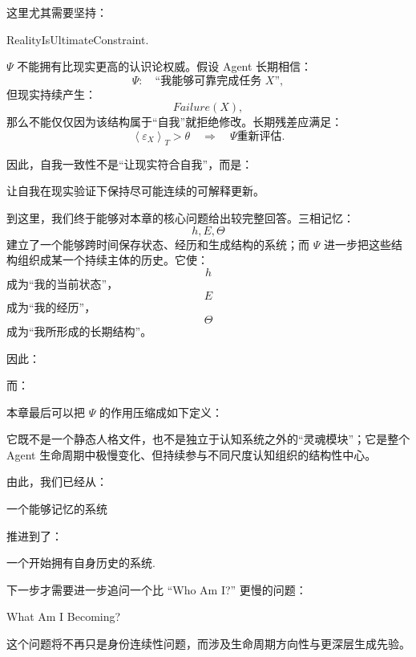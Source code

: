 这里尤其需要坚持：
\begin{statementbox}
RealityIsUltimateConstraint.
\end{statementbox}
$\Psi$ 不能拥有比现实更高的认识论权威。假设 Agent 长期相信：
\[
\Psi:
\quad
\text{“我能够可靠完成任务 $X$”},
\]
但现实持续产生：
\[
Failure(X),
\]
那么不能仅仅因为该结构属于“自我”就拒绝修改。长期残差应满足：
\[
\left\langle
\varepsilon_X
\right\rangle_T
>
\theta
\quad\Longrightarrow\quad
\Psi\text{重新评估}.
\]

因此，自我一致性不是“让现实符合自我”，而是：
\begin{statementbox}
让自我在现实验证下保持尽可能连续的可解释更新。
\end{statementbox}

到这里，我们终于能够对本章的核心问题给出较完整回答。三相记忆：
\[
h,E,\Theta
\]
建立了一个能够跨时间保存状态、经历和生成结构的系统；而 $\Psi$ 进一步把这些结构组织成某一个持续主体的历史。它使：
\[
h
\]
成为“我的当前状态”，
\[
E
\]
成为“我的经历”，
\[
\Theta
\]
成为“我所形成的长期结构”。

因此：
\begin{statementbox}
\centering
{}
\end{statementbox}
而：
\begin{statementbox}
\centering
{}
\end{statementbox}

本章最后可以把 $\Psi$ 的作用压缩成如下定义：

\begin{statementbox}
\centering
{}
\end{statementbox}

它既不是一个静态人格文件，也不是独立于认知系统之外的“灵魂模块”；它是整个 Agent 生命周期中极慢变化、但持续参与不同尺度认知组织的结构性中心。

由此，我们已经从：
\begin{statementbox}
一个能够记忆的系统
\end{statementbox}
推进到了：
\begin{statementbox}
一个开始拥有自身历史的系统.
\end{statementbox}

下一步才需要进一步追问一个比 ``Who Am I?'' 更慢的问题：

\begin{statementbox}
What Am I Becoming?
\end{statementbox}

这个问题将不再只是身份连续性问题，而涉及生命周期方向性与更深层生成先验。
